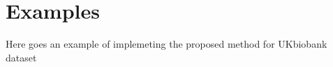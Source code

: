 

\section{Examples}\label{sec:examples}

Here goes an example of implemeting the proposed method for UKbiobank dataset